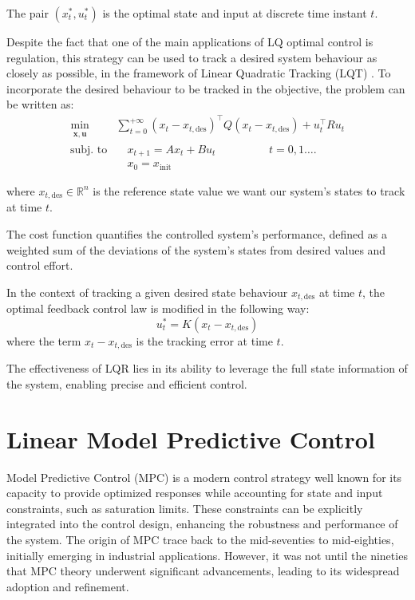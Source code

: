 \documentclass[a4paper,12pt,oneside]{book}
\begin{document}
The pair $(x_t^*, u_t^*)$ is the optimal state and input at discrete time instant $t$.

\bigskip
Despite the fact that one of the main applications of LQ optimal control is regulation, this strategy can be used to track a desired system behaviour as closely as possible, in the framework of Linear Quadratic Tracking (LQT) \cite{Linear_Quadratic_Tracking}.
To incorporate the desired behaviour to be tracked in the objective, the problem can be written as:
\begin{equation}
\begin{aligned}
	\min_{\substack{\boldsymbol{x}, \boldsymbol{u}}}\quad & \sum_{t=0}^{+\infty}  (x_t - x_{t,\text{des}})^\top Q (x_t - x_{t,\text{des}}) + u_t^\top R u_t  \\
	\text{subj. to} & \quad x_{t+1}  = A x_t + B u_t \hspace{2cm} t = 0, 1 \ldots. \\
    & \quad x_0 = x_{\text{init}}
\end{aligned}
\label{eq:LQR}
\end{equation}

where $x_{t,\text{des}} \in \mathbb{R}^n$ is the reference state value we want our system's states to track at time $t$.

The cost function quantifies the controlled system's performance, defined as a weighted sum of the deviations of the system's states from desired values and control effort.

In the context of tracking a given desired state behaviour $x_{t,\text{des}}$ at time $t$, the optimal feedback control law is modified in the following way:
\begin{equation}
    u_t^* = K (x_t - x_{t,\text{des}})
\label{Closed-loop_control_law}
\end{equation}
where the term $x_t - x_{t,\text{des}}$ is the tracking error at time $t$.

The effectiveness of LQR lies in its ability to leverage the full state information of the system, enabling precise and efficient control.


\section{Linear Model Predictive Control}
Model Predictive Control (MPC) is a modern control strategy well known for its capacity to provide optimized responses while accounting for state and input constraints, such as saturation limits.
These constraints can be explicitly integrated into the control design, enhancing the robustness and performance of the system. 
The origin of MPC trace back to the mid-seventies to mid-eighties, initially emerging in industrial applications. 
However, it was not until the nineties that MPC theory underwent significant advancements, leading to its widespread adoption and refinement.
\end{document}

